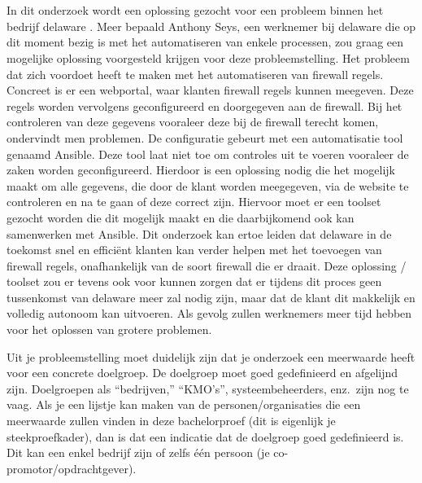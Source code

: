 \section{}%
\label{sec:probleemstelling}
In dit onderzoek wordt een oplossing gezocht voor een probleem binnen het bedrijf delaware . Meer bepaald Anthony Seys, een werknemer bij delaware die op dit moment bezig is met het automatiseren van enkele processen, zou graag een mogelijke oplossing voorgesteld krijgen voor deze probleemstelling. Het probleem dat zich voordoet heeft te maken met het automatiseren van firewall regels. Concreet is er een webportal, waar klanten firewall regels kunnen meegeven. Deze regels worden vervolgens geconfigureerd en doorgegeven aan de firewall. Bij het controleren van deze gegevens vooraleer deze bij de firewall terecht komen, ondervindt men problemen. De configuratie gebeurt met een automatisatie tool genaamd Ansible. Deze tool laat niet toe om controles uit te voeren vooraleer de zaken worden geconfigureerd. Hierdoor is een oplossing nodig   die het mogelijk maakt om alle gegevens, die door de klant worden meegegeven, via de website te controleren en na te gaan of deze correct zijn. Hiervoor moet er een toolset gezocht worden die dit mogelijk maakt en die daarbijkomend ook kan samenwerken met Ansible. Dit onderzoek kan ertoe leiden dat delaware in de toekomst snel en efficiënt klanten kan verder helpen met het toevoegen van firewall regels, onafhankelijk van de soort firewall die er draait. Deze oplossing / toolset zou er tevens ook voor kunnen zorgen dat er tijdens dit proces geen tussenkomst van delaware meer zal nodig zijn, maar dat de klant dit makkelijk en volledig autonoom kan uitvoeren. Als gevolg zullen  werknemers meer tijd hebben voor het oplossen van grotere problemen. \newline



Uit je probleemstelling moet duidelijk zijn dat je onderzoek een meerwaarde heeft voor een concrete doelgroep. De doelgroep moet goed gedefinieerd en afgelijnd zijn. Doelgroepen als ``bedrijven,'' ``KMO's'', systeembeheerders, enz.~zijn nog te vaag. Als je een lijstje kan maken van de personen/organisaties die een meerwaarde zullen vinden in deze bachelorproef (dit is eigenlijk je steekproefkader), dan is dat een indicatie dat de doelgroep goed gedefinieerd is. Dit kan een enkel bedrijf zijn of zelfs één persoon (je co-promotor/opdrachtgever).

\section{}%
\label{sec:onderzoeksvraag}


